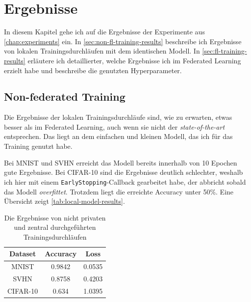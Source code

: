 \chapter{Ergebnisse}\label{chap:results}

In diesem Kapitel gehe ich auf die Ergebnisse der Experimente aus \autoref{chap:experiments} ein. In \autoref{sec:non-fl-training-results} beschreibe ich Ergebnisse von lokalen Trainingsdurchläufen mit dem identischen Modell. In \autoref{sec:fl-training-results} erläutere ich detaillierter, welche Ergebnisse ich im Federated Learning erzielt habe und beschreibe die genutzten Hyperparameter.

\section{Non-federated Training} \label{sec:non-fl-training-results}
Die Ergebnisse der lokalen Trainingsdurchläufe sind, wie zu erwarten, etwas besser als im Federated Learning, auch wenn sie nicht der \textit{state-of-the-art} entsprechen. Das liegt an dem einfachen und kleinen Modell, das ich für das Training genutzt habe.

Bei MNIST und SVHN erreicht das Modell bereits innerhalb von 10 Epochen gute Ergebnisse. Bei CIFAR-10 sind die Ergebnisse deutlich schlechter, weshalb ich hier mit einem \texttt{EarlyStopping}-Callback gearbeitet habe, der abbricht sobald das Modell \textit{overfittet}. Trotzdem liegt die erreichte Accuracy unter 50\%. Eine Übersicht zeigt \autoref{tab:local-model-results}.

\begin{table}
	\centering
	\begin{tabular}{ccc}
		\toprule
		Dataset & Accuracy & Loss \\
		\midrule
		MNIST & 0.9842 & 0.0535 \\
		SVHN & 0.8758 & 0.4203 \\
		CIFAR-10 & 0.634 & 1.0395 \\
		\bottomrule
	\end{tabular}
	\caption{Die Ergebnisse von nicht privaten und zentral durchgeführten Trainingsdurchläufen}
	\label{tab:local-model-results}
\end{table}


